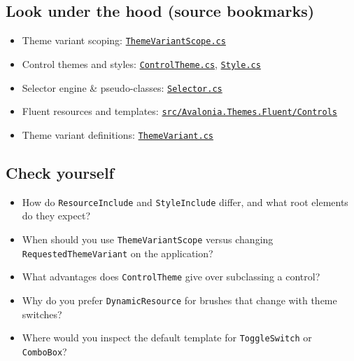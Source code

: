 \subsection{Look under the hood (source
bookmarks)}\label{look-under-the-hood-source-bookmarks-5}

\begin{itemize}
\tightlist
\item
  Theme variant scoping:
  \href{https://github.com/AvaloniaUI/Avalonia/blob/master/src/Avalonia.Controls/ThemeVariantScope.cs}{\passthrough{\lstinline!ThemeVariantScope.cs!}}
\item
  Control themes and styles:
  \href{https://github.com/AvaloniaUI/Avalonia/blob/master/src/Avalonia.Base/Styling/ControlTheme.cs}{\passthrough{\lstinline!ControlTheme.cs!}},
  \href{https://github.com/AvaloniaUI/Avalonia/blob/master/src/Avalonia.Base/Styling/Style.cs}{\passthrough{\lstinline!Style.cs!}}
\item
  Selector engine \& pseudo-classes:
  \href{https://github.com/AvaloniaUI/Avalonia/blob/master/src/Avalonia.Styling/Selector.cs}{\passthrough{\lstinline!Selector.cs!}}
\item
  Fluent resources and templates:
  \href{https://github.com/AvaloniaUI/Avalonia/tree/master/src/Avalonia.Themes.Fluent/Controls}{\passthrough{\lstinline!src/Avalonia.Themes.Fluent/Controls!}}
\item
  Theme variant definitions:
  \href{https://github.com/AvaloniaUI/Avalonia/blob/master/src/Avalonia.Styling/ThemeVariant.cs}{\passthrough{\lstinline!ThemeVariant.cs!}}
\end{itemize}

\subsection{Check yourself}\label{check-yourself-5}

\begin{itemize}
\tightlist
\item
  How do \passthrough{\lstinline!ResourceInclude!} and
  \passthrough{\lstinline!StyleInclude!} differ, and what root elements
  do they expect?
\item
  When should you use \passthrough{\lstinline!ThemeVariantScope!} versus
  changing \passthrough{\lstinline!RequestedThemeVariant!} on the
  application?
\item
  What advantages does \passthrough{\lstinline!ControlTheme!} give over
  subclassing a control?
\item
  Why do you prefer \passthrough{\lstinline!DynamicResource!} for
  brushes that change with theme switches?
\item
  Where would you inspect the default template for
  \passthrough{\lstinline!ToggleSwitch!} or
  \passthrough{\lstinline!ComboBox!}?
\end{itemize}

